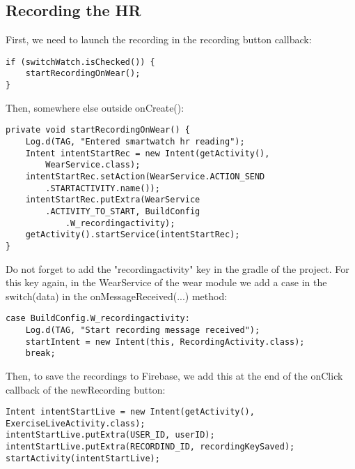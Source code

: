 \documentclass[11pt]{article}
\begin{document}
\subsection{Recording the HR}
First, we need to launch the recording in the recording button callback:
\begin{lstlisting}
if (switchWatch.isChecked()) {
    startRecordingOnWear();
}
\end{lstlisting}
Then, somewhere else outside onCreate():
\begin{lstlisting}
private void startRecordingOnWear() {
    Log.d(TAG, "Entered smartwatch hr reading");
    Intent intentStartRec = new Intent(getActivity(),
        WearService.class);
    intentStartRec.setAction(WearService.ACTION_SEND
        .STARTACTIVITY.name());
    intentStartRec.putExtra(WearService
        .ACTIVITY_TO_START, BuildConfig
            .W_recordingactivity);
    getActivity().startService(intentStartRec);
}
\end{lstlisting}
Do not forget to add the "recordingactivity" key in the gradle of the project.
For this key again, in the WearService of the wear module we add a case in the switch(data) in the
onMessageReceived(...) method:
\begin{lstlisting}
case BuildConfig.W_recordingactivity:
    Log.d(TAG, "Start recording message received");
    startIntent = new Intent(this, RecordingActivity.class);
    break;
\end{lstlisting}
Then, to save the recordings to Firebase, we add this at the end of the onClick callback of the newRecording button:
\begin{lstlisting}
Intent intentStartLive = new Intent(getActivity(), ExerciseLiveActivity.class);
intentStartLive.putExtra(USER_ID, userID);
intentStartLive.putExtra(RECORDIND_ID, recordingKeySaved);
startActivity(intentStartLive);
\end{lstlisting}
\end{document}
